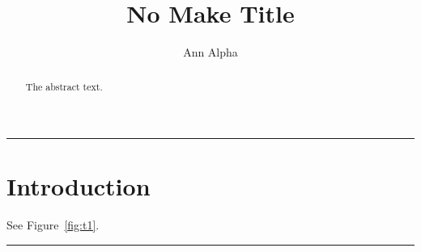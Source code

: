 \documentclass[sigconf,nonacm]{acmart}
\begin{document}
\title{No Make Title}
\author{Ann Alpha}
\begin{abstract}
The abstract text.
\end{abstract}
\begin{teaserfigure}
\centering\rule{2cm}{1cm}
\caption{Lost teaser}\label{fig:t1}
\end{teaserfigure}
\section{Introduction}
See Figure~\ref{fig:t1}.
\begin{teaserfigure}
\centering\rule{2cm}{1cm}
\caption{Late teaser}\label{fig:t2}
\end{teaserfigure}
\end{document}
